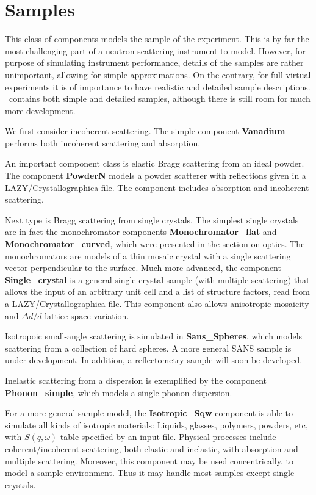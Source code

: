 \chapter{Samples}

This class of components models the sample of the experiment.
This is by far the most challenging part of a neutron scattering
instrument to model. However, for purpose of simulating
instrument performance, details of the samples are rather unimportant,
allowing for simple approximations. On the contrary, for full
virtual experiments it is of importance to have realistic and
detailed sample descriptions. \MCS\ contains both simple and detailed
samples, although there is still room for much more development.

We first consider incoherent scattering. The simple component {\bf Vanadium}
performs both incoherent scattering and absorption.

An important component class is elastic Bragg scattering from an ideal powder.
The component {\bf PowderN} models a powder scatterer with reflections 
given in a LAZY/Crystallographica file.
The component includes absorption and incoherent scattering. 

Next type is Bragg scattering from single crystals.
The simplest single crystals are in fact the monochromator components
{\bf Monochromator\_flat} and {\bf Monochromator\_curved},
which were presented in the section on optics.
The monochromators are models of a thin mosaic crystal
with a single scattering vector perpendicular to the surface.
Much more advanced, the component {\bf Single\_crystal}
is a general single crystal sample (with multiple scattering) that allows
the input of an arbitrary unit cell and a list of structure factors, read
from a LAZY/Crystallographica file.
This component also allows anisotropic mosaicity 
and $\Delta d/d$ lattice space variation.

Isotropoic small-angle scattering is simulated in {\bf Sans\_Spheres},
which models scattering from a collection of hard spheres. A more general
SANS sample is under development. 
In addition, a reflectometry sample will soon be developed.

Inelastic scattering from a dispersion is exemplified by
the component {\bf Phonon\_simple}, which models a single phonon dispersion.

For a more general sample model, the {\bf Isotropic\_Sqw} component 
is able to simulate all kinds of isotropic materials: 
Liquids, glasses, polymers, powders, etc, with $S(q,\omega)$ table
specified by an input file.
Physical processes include coherent/incoherent scattering, 
both elastic and inelastic, with absorption and multiple scattering. 
Moreover, this component may be used concentrically, 
to model a sample environment. 
Thus it may handle most samples except single crystals.

